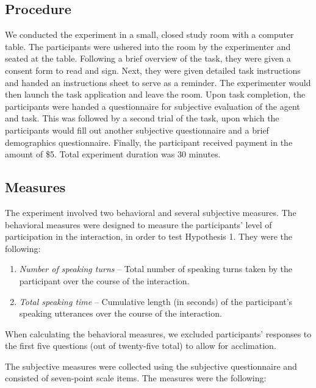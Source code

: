 \subsection{Procedure}

We conducted the experiment in a small, closed study room with a computer table. The participants were ushered into the room by the experimenter and seated at the table. Following a brief overview of the task, they were given a consent form to read and sign. Next, they were given detailed task instructions and handed an instructions sheet to serve as a reminder. The experimenter would then launch the task application and leave the room. Upon task completion, the participants were handed a questionnaire for subjective evaluation of the agent and task. This was followed by a second trial of the task, upon which the participants would fill out another subjective questionnaire and a brief demographics questionnaire. Finally, the participant received payment in the amount of \$5. Total experiment duration was 30 minutes.

\subsection{Measures}

The experiment involved two behavioral and several subjective measures. The behavioral measures were designed to measure the participants' level of participation in the interaction, in order to test Hypothesis 1. They were the following:

\begin{enumerate}
\item \emph{Number of speaking turns} -- Total number of speaking turns taken by the participant over the course of the interaction.
\item \emph{Total speaking time} -- Cumulative length (in seconds) of the participant's speaking utterances over the course of the interaction.
\end{enumerate}

When calculating the behavioral measures, we excluded participants' responses to the first five questions (out of twenty-five total) to allow for acclimation.

The subjective measures were collected using the subjective questionnaire and consisted of seven-point scale items. The measures were the following:

